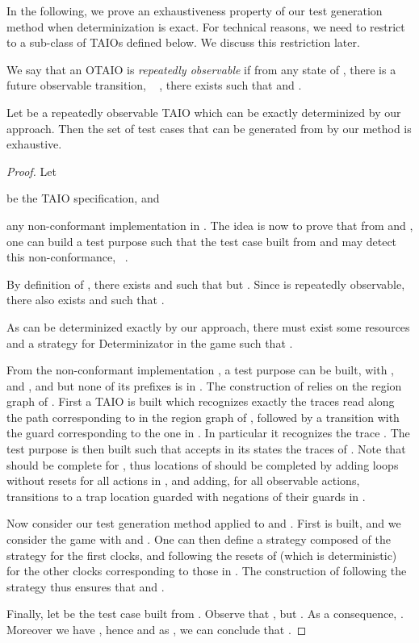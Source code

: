 \documentclass{LMCS}
\theoremstyle{plain}\newtheorem{proposition}[thm]{Proposition}
\begin{document}
In the following, we prove an exhaustiveness property of our test generation method when determinization is exact.
For technical reasons, we need to restrict to a sub-class of TAIOs defined below.
We discuss this restriction later.

\begin{defi}
We say that an OTAIO  is {\em repeatedly observable}
if from any state of , there is a future observable transition,
\ie~ 
, there exists  such that 
 and  .  
\end{defi}


\begin{thm}[Exhaustiveness]
\label{th:exhaustiveness}
Let  be a repeatedly observable TAIO which can be exactly
determinized by our approach.  Then the set of test cases that can be
generated from  by our method is exhaustive.
\end{thm}

\begin{proof}
  Let
  
  be the TAIO specification, and
  
  any non-conformant implementation in .  The idea is
  now to prove that from  and , one can build a test purpose
   such that the test case  built from  and  may
  detect this non-conformance, \ie~.

  By definition of , there exists  and  such that
   but .  Since  is repeatedly observable, there also exists
   and  such that
  .

  As  can be determinized exactly by our approach, there must
  exist some resources  and a strategy  for
  Determinizator in the game  such that
  .



  From the non-conformant implementation , a test purpose
   can be built, with ,  and , and
   but none of its prefixes
  is in .  The construction of  relies on
  the region graph of .  First a TAIO 
  is built which recognizes exactly the traces read along the path
  corresponding to  in the region graph of
  , followed by a transition  with the
  guard corresponding to the one in .  In
  particular it recognizes the trace .  The test
  purpose  is then built such that  accepts in
  its states  the traces of .  Note that 
  should be complete for , thus locations of  should be
  completed by adding loops without resets for all actions in
  , and adding, for all observable actions, transitions
  to a trap location guarded with negations of their guards in .

  Now consider our test generation method applied to  and .
  First  is built, and we consider the game
   with  and
  .  One can then define a strategy  composed
  of the strategy  for the  first clocks, and following the
  resets of  (which is deterministic) for the other clocks
  corresponding to those in .  The construction of
   following the strategy  thus ensures that
   and .

  Finally, let  be the test case built from .  Observe that
  , but . As a consequence, . 
Moreover we have , hence 
   and as
  , we can conclude that  .
\end{proof}
\end{document}
